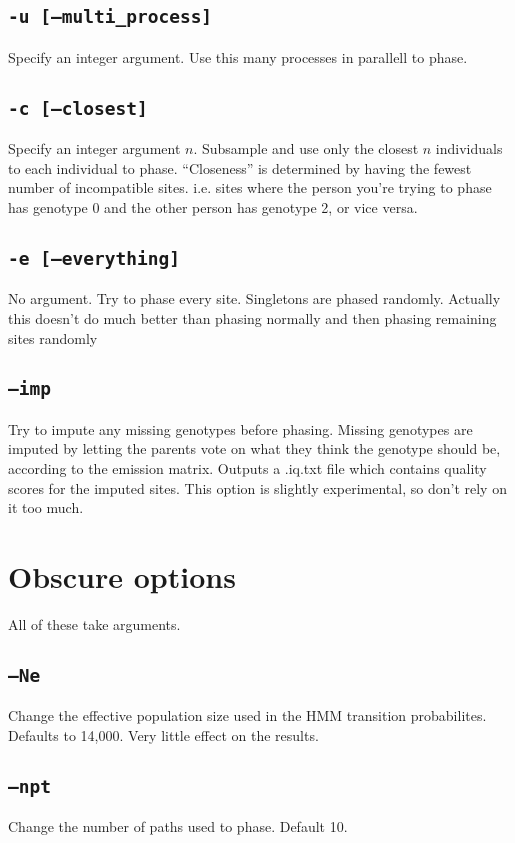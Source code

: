 \documentclass[10pt]{refart}
\begin{document}
\subsection{\texttt{-u [--multi\_process]}}
Specify an integer argument. Use this many processes in parallell to phase. 

\subsection{\texttt{-c [--closest]}}
Specify an integer argument $n$. Subsample and use only the closest $n$ individuals to each individual to phase. ``Closeness'' is determined by having the fewest number of incompatible sites. i.e. sites where the person you're trying to phase has genotype 0 and the other person has genotype 2, or vice versa. 

\subsection{\texttt{-e [--everything]}}
No argument. Try to phase every site. Singletons are phased randomly. Actually this doesn't do much better than phasing normally and then phasing remaining sites randomly

\subsection{\texttt{--imp}}
Try to impute any missing genotypes before phasing. Missing genotypes are
imputed by letting the parents vote on what they think the
genotype should be, according to the emission matrix. Outputs a
.iq.txt file which contains quality scores for the imputed
sites. This option is slightly experimental, so don't rely on it too
much. 

\newpage

\section{Obscure options}
All of these take arguments. 
\subsection{\texttt{--Ne}}
Change the effective population size used in the HMM transition probabilites. Defaults to 14,000. Very little effect on the results.

\subsection{\texttt{--npt}}
Change the number of paths used to phase. Default 10.
\end{document}
